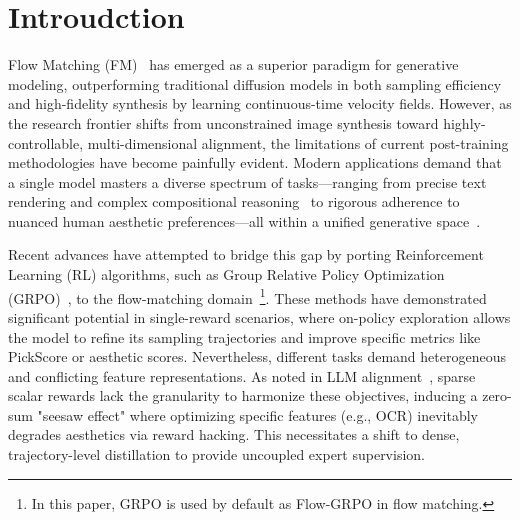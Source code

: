 \section{Introudction}
Flow Matching (FM)~\cite{batifol2025flux,esser2024scaling,lipman2022flow,fang2025dualvla} has emerged as a superior paradigm for generative modeling, outperforming traditional diffusion models in both sampling efficiency and high-fidelity synthesis by learning continuous-time velocity fields.
%
However, as the research frontier shifts from unconstrained image synthesis toward highly-controllable, multi-dimensional alignment, the limitations of current post-training methodologies have become painfully evident. Modern applications demand that a single model masters a diverse spectrum of tasks—ranging from precise text rendering and complex compositional reasoning~\cite{huang2026visionr1incentivizingreasoningcapability, huang2026vision, chen2025advancing, chen2025ares, guo2025deepseek, chen2026opensearchvlopenrecipefrontier} to rigorous adherence to nuanced human aesthetic preferences—all within a unified generative space~\cite{han2026unicorn, chen2026unify,feng2026gen, huang2025interleaving}.

Recent advances have attempted to bridge this gap by porting Reinforcement Learning (RL) algorithms, such as Group Relative Policy Optimization (GRPO)~\cite{r1}, to the flow-matching domain~\cite{liu2025flow,xue2025dancegrpo,li2025mixgrpo}\footnote{In this paper, GRPO is used by default as Flow-GRPO in flow matching.}. These methods have demonstrated significant potential in single-reward scenarios, where on-policy exploration allows the model to refine its sampling trajectories and improve specific metrics like PickScore or aesthetic scores.
%
Nevertheless, different tasks demand heterogeneous and conflicting feature representations. As noted in LLM alignment~\cite{zeng2026glm}, sparse scalar rewards lack the granularity to harmonize these objectives, inducing a zero-sum "seesaw effect" where optimizing specific features (e.g., OCR) inevitably degrades aesthetics via reward hacking. This necessitates a shift to dense, trajectory-level distillation to provide uncoupled expert supervision.
%

